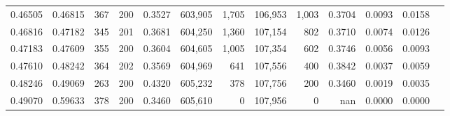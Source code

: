 \begin{tabular}{rrrrrrrrrrrrr}
0.46505 & 0.46815 &   367 & 200 &                                     0.3527 & 603,905 &   1,705 & 106,953 &   1,003 & 0.3704 & 0.0093 & 0.0158 \\
0.46816 & 0.47182 &   345 & 201 &                                     0.3681 & 604,250 &   1,360 & 107,154 &     802 & 0.3710 & 0.0074 & 0.0126 \\
0.47183 & 0.47609 &   355 & 200 &                                     0.3604 & 604,605 &   1,005 & 107,354 &     602 & 0.3746 & 0.0056 & 0.0093 \\
0.47610 & 0.48242 &   364 & 202 &                                     0.3569 & 604,969 &     641 & 107,556 &     400 & 0.3842 & 0.0037 & 0.0059 \\
0.48246 & 0.49069 &   263 & 200 &                                     0.4320 & 605,232 &     378 & 107,756 &     200 & 0.3460 & 0.0019 & 0.0035 \\
0.49070 & 0.59633 &   378 & 200 &                                     0.3460 & 605,610 &       0 & 107,956 &       0 &    nan & 0.0000 & 0.0000 \\
\bottomrule
\end{tabular}
